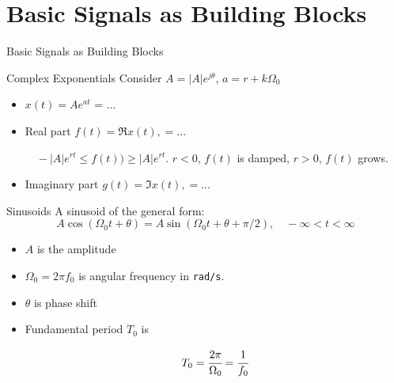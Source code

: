 \documentclass[aspectratio=169,xcolor=dvipsnames,svgnames,x11names,fleqn]{beamer}
\begin{document}
\section{Basic Signals as Building Blocks
}


\begin{frame}{}
    \begin{center}
    \Huge \bf \color{DarkBlue}
    \faBuilding
    
    Basic Signals as Building Blocks

\end{center}
\end{frame}

\begin{frame}{Complex Exponentials}
Consider $A = |A|e^{j\theta}$, $a = r + k\Omega_0$
\begin{itemize}
    \item $x(t) = Ae^{at}$ = ...
    \item Real part $f(t) = \Re{x(t)}, = ... $
    
    \vspace{20pt}
    
    $\quad  -|A|e^{rt} \leq f(t)) \geq |A|e^{rt}$. $r< 0$, $f(t)$ is damped, $r>0 $, $f(t)$ grows.
    \item  Imaginary part $g(t) = \Im{x(t)}, = ... $
    
    \vspace{20pt}
\end{itemize}
    
\end{frame}

\begin{frame}{Sinusoids}
A sinusoid of the general form:
$$
A\cos(\Omega_0 t + \theta) = A\sin (\Omega_0 t + \theta + \pi/ 2), \quad -\infty < t < \infty
$$

\begin{itemize}
    \item $A$ is the amplitude
    \item $\Omega_0 = 2\pi f_0$ is angular frequency in \texttt{rad/s}.
    \item $\theta$ is phase shift
    \item Fundamental period $T_0$ is 

    $$
    T_0 = \cfrac{2\pi}{\Omega_0} = \cfrac{1}{f_0}
    $$
\end{itemize}
    
\end{frame}
\end{document}
